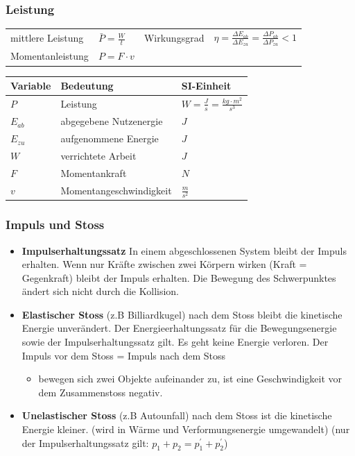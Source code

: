 \documentclass[
a4paper,
oneside,
landscape, 
8pt,
]{scrartcl}
\begin{document}
\begin{multicols*}{2}
\clearpage

\subsubsection{Leistung}

\begin{tabbing}
	\begin{tabu} to \linewidth {l X l X}
		\toprule
		mittlere Leistung & $\bar{P} = \frac{W}{t}$ &
		Wirkungsgrad & $\eta = \frac{\Delta E_{ab}}{\Delta E_{zu}} = \frac{\Delta P_{ab}}{\Delta P_{zu}} < 1$ \\
		Momentanleistung & $P = F \cdot v$ & & \\
	\end{tabu}
\end{tabbing}

\begin{tabbing}
	\begin{tabu} to \linewidth {l X l}
		Variable & Bedeutung & SI-Einheit \\
		\midrule
		$P$ & Leistung & $W = \frac{J}{s} = \frac{kg \cdot m^2}{s^3}$ \\
		$E_{ab}$ & abgegebene Nutzenergie & $J$ \\
		$E_{zu}$ & aufgenommene Energie &  $J$ \\
		$W$ & verrichtete Arbeit &  $J$ \\
		$F$ & Momentankraft &  $N$ \\
		$v$ & Momentangeschwindigkeit &  $\frac{m}{s^2}$ \\
		\bottomrule
	\end{tabu}
\end{tabbing}


\subsubsection{Impuls und Stoss}
\begin{itemize}
	\item \textbf{Impulserhaltungssatz} In einem abgeschlossenen System bleibt der Impuls erhalten. Wenn nur Kräfte zwischen zwei Körpern wirken (Kraft = Gegenkraft) bleibt der Impuls erhalten. Die Bewegung des Schwerpunktes ändert sich nicht durch die Kollision.
	\item \textbf{Elastischer Stoss}  (z.B Billiardkugel) nach dem Stoss bleibt die kinetische Energie unverändert. Der Energieerhaltungssatz für die Bewegungsenergie sowie der Impulserhaltungssatz gilt. Es geht keine Energie verloren. Der Impuls vor dem Stoss = Impuls nach dem Stoss
	\begin{itemize}
		\item bewegen sich zwei Objekte aufeinander zu, ist eine Geschwindigkeit vor dem Zusammenstoss negativ.
	\end{itemize}
	\item \textbf{Unelastischer Stoss} (z.B Autounfall)
	nach dem Stoss ist die kinetische Energie kleiner. (wird in Wärme und Verformungsenergie umgewandelt) (nur der Impulserhaltungssatz gilt: $p_1 + p_2 = p_1^{'} + p_2^{'}$)
\end{itemize}



\end{multicols*}
\end{document}
